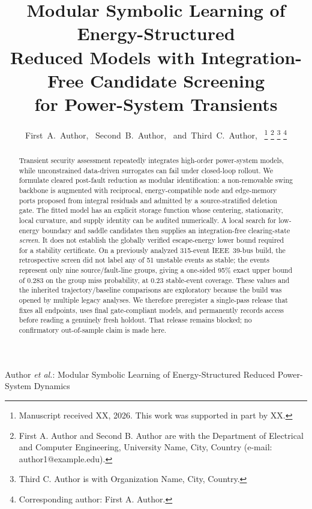 \documentclass[journal]{IEEEtran}
\begin{document}
\title{Modular Symbolic Learning of Energy-Structured\\ Reduced Models with Integration-Free Candidate Screening\\ for Power-System Transients}

\author{First~A.~Author,~
        Second~B.~Author,~
        and~Third~C.~Author,~%
\thanks{Manuscript received XX, 2026. This work was supported in part by XX.}
\thanks{First A. Author and Second B. Author are with the Department of Electrical and Computer Engineering, University Name, City, Country (e-mail: author1@example.edu).}
\thanks{Third C. Author is with Organization Name, City, Country.}
\thanks{Corresponding author: First A. Author.}}

%
{Author \MakeLowercase{\textit{et al.}}: Modular Symbolic Learning of Energy-Structured Reduced Power-System Dynamics}

\maketitle

\begin{abstract}
Transient security assessment repeatedly integrates high-order power-system
models, while unconstrained data-driven surrogates can fail under closed-loop
rollout. We formulate cleared post-fault reduction as modular identification:
a non-removable swing backbone is augmented with reciprocal, energy-compatible
node and edge-memory ports proposed from integral residuals and admitted by a
source-stratified deletion gate. The fitted model has an explicit storage
function whose centering, stationarity, local curvature, and supply identity can
be audited numerically. A local search for low-energy boundary and saddle
candidates then supplies an integration-free clearing-state \emph{screen}. It
does not establish the globally verified escape-energy lower bound required for
a stability certificate. On a previously analyzed 315-event IEEE~39-bus build,
the retrospective screen did not label any of 51 unstable events as stable; the
events represent only nine source/fault-line groups, giving a one-sided 95\%
exact upper bound of 0.283 on the group miss probability, at 0.23 stable-event
coverage. These values and the inherited trajectory/baseline comparisons are
exploratory because the build was opened by multiple legacy analyses. We
therefore preregister a single-pass release that fixes all endpoints, uses final
gate-compliant models, and permanently records access before reading a genuinely
fresh holdout. That release remains blocked; no confirmatory out-of-sample claim
is made here.
\end{abstract}
\end{document}
